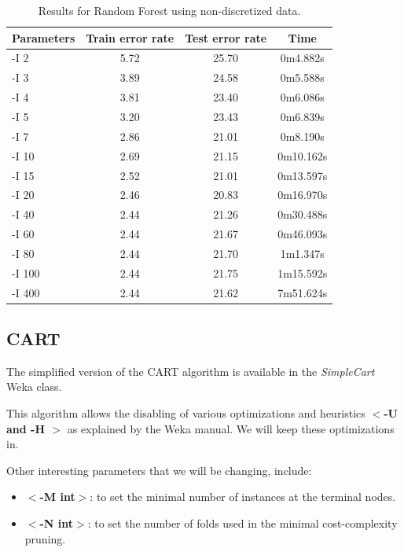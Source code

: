 \documentclass[a4paper]{llncs}
\begin{document}
\begin{table}[ht]
  \begin{center}
  \begin{tabular}{ | l | c | c | c |}
    \hline
    \textbf{Parameters} & \textbf{Train error rate} & \textbf{Test error rate} & \textbf{Time} \\ \hline
    -I 2 & 5.72 & 25.70 & 0m4.882s \\ \hline
    -I 3 & 3.89 & 24.58 & 0m5.588s \\ \hline
    -I 4 & 3.81 & 23.40 & 0m6.086s \\ \hline
    -I 5 & 3.20 & 23.43 & 0m6.839s \\ \hline
    -I 7 & 2.86 & 21.01 & 0m8.190s \\ \hline
    -I 10 & 2.69 & 21.15 & 0m10.162s \\ \hline
    -I 15 & 2.52 & 21.01 & 0m13.597s \\ \hline
    -I 20 & 2.46 & 20.83 & 0m16.970s \\ \hline
    -I 40 & 2.44 & 21.26 & 0m30.488s \\ \hline
    -I 60 & 2.44 & 21.67 & 0m46.093s \\ \hline
    -I 80 & 2.44 & 21.70 & 1m1.347s \\ \hline
    -I 100 & 2.44 & 21.75 & 1m15.592s \\ \hline
    -I 400 & 2.44 & 21.62 & 7m51.624s \\ \hline
  \end{tabular}
  \caption{Results for Random Forest using non-discretized data.}
  \label{tbl:results_random_forest_raw}
  \end{center}
\end{table}

\subsection{CART}

The simplified version of the CART algorithm is available
in the \textit{SimpleCart} Weka class.

This algorithm allows the disabling of various optimizations
and heuristics \textbf{$<$-U and -H $>$} as explained by the Weka manual.
We will keep these optimizations in.

Other interesting parameters that we will be changing, include:

\begin{itemize}
  \item \textbf{$<$-M int$>$}: to set the minimal number of instances at the terminal nodes.
  \item \textbf{$<$-N int$>$}: to set the number of folds used in the minimal cost-complexity pruning.
\end{itemize}
\end{document}

